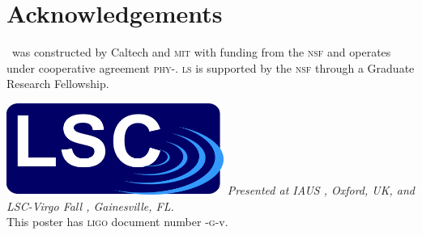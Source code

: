 \documentclass[portrait,plainboxedsections]{sciposter}
\begin{document}
\begin{minipage}[t]{0.33\textwidth}


\end{minipage}%
\hspace{0.05\textwidth}%
\begin{minipage}[t]{0.62\textwidth}
\section*{Acknowledgements}

\LIGO\ was constructed by Caltech and \textsc{mit} with funding from the
\textsc{nsf} and operates under cooperative agreement
\textsc{phy}-. \textsc{ls} is supported by the
\textsc{nsf} through a Graduate Research Fellowship.
\newline\newline

\includegraphics[height=3cm]{figures/LSC_logo}\hspace{7.5mm}
\hspace{7.5mm}
\newline\newline
\emph{Presented at {\small IAUS} , Oxford, UK, and LSC-Virgo Fall , Gainesville, FL.} \\
This poster has \textsc{ligo} document number \LIGO{}-\textsc{g}-v.
\end{minipage}
\end{document}
